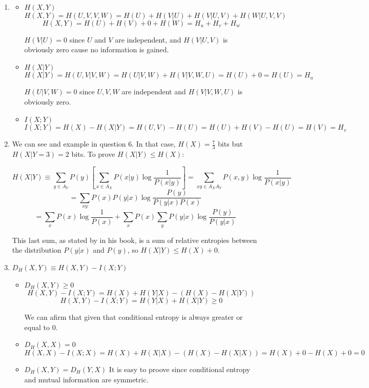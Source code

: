\documentclass{article}
\begin{document}
\begin{enumerate}
	\item
	      \begin{itemize}
		      \item \(H(X, Y)\)
		            \[H(X, Y) = H(U, V, V, W) = H(U) + H(V | U) + H(V | U, V) + H(W | U, V, V)\]
		            \[H(X, Y) = H(U) + H(V) + 0 + H(W) = H_u + H_v + H_w\]

		            \(H(V | U) = 0\) since \(U\) and \(V\) are independent, and \(H(V | U, V)\) is obviously zero cause no information is gained.

		      \item \(H(X | Y)\)
		            \[H(X | Y) = H(U,V | V, W) = H(U | V, W) + H(V | V, W, U) = H(U) + 0 = H(U) = H_u\]

		            \(H(U | V, W) = 0\) since \(U, V, W\) are independent and \(H(V | V, W, U)\) is obviously zero.

		      \item \(I(X;Y)\)
		            \[I(X;Y) = H(X) - H(X|Y) = H(U, V) - H(U) = H(U) + H(V) - H(U) = H(V) = H_v\]
	      \end{itemize}

	\item We can see and example in question 6. In that case, \(H(X) = \frac{7}{3}\) bits but \(H(X | Y = 3) = 2\) bits.
	      To prove \(H(X | Y) \leq H(X)\):

	      \[ H(X | Y) \equiv \sum_{y \in A_Y} P(y) \left[ \sum_{x \in A_X} P(x | y) \log \frac{1}{P(x | y)} \right] = \sum_{xy \in A_X A_Y} P(x, y) \log \frac{1}{P(x | y)}\]
	      \[ = \sum_{xy} P(x)P(y | x) \log \frac{P(y)}{P(y | x)P(x)}\]
	      \[ = \sum_{x} P(x) \log \frac{1}{P(x)} + \sum_{x} P(x) \sum_{y} P(y | x) \log \frac{P(y)}{P(y | x)}\]

	      This last sum, as stated by \cite{MacKay} in his book, is a sum of relative entropies between the distribution \(P(y | x)\) and \(P(y)\), so \(H(X | Y) \leq H(X) + 0\).

	\item \(D_H(X, Y) \equiv H(X, Y) - I(X; Y)\)
	      \begin{itemize}
		      \item \(D_H(X, Y) \geq 0\)
		            \[H(X, Y) - I(X; Y) = H(X) + H(Y|X) - (H(X) - H(X|Y))\]
		            \[H(X, Y) - I(X; Y) = H(Y|X) + H(X|Y) \geq 0\]

		            We can afirm that given that conditional entropy is always greater or equal to 0.

		      \item \(D_H(X, X) = 0\)
		            \[H(X, X) - I(X;X) = H(X) + H(X|X) - (H(X) - H(X|X)) = H(X) + 0 - H(X) + 0 = 0\]
		      \item \(D_H(X, Y) = D_H(Y, X)\)
		            It is easy to proove since conditional entropy and mutual information are symmetric.


\end{itemize}
\end{enumerate}
\end{document}
